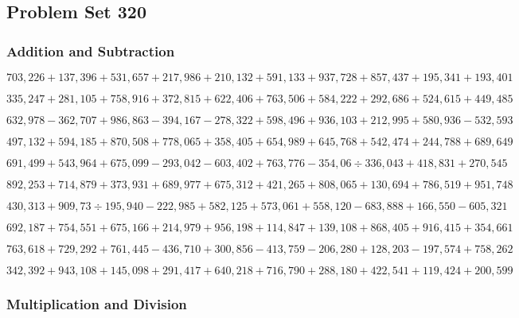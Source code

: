 \hypertarget{problem-set-320}{%
\subsection{Problem Set 320}\label{problem-set-320}}

\hypertarget{addition-and-subtraction}{%
\subsubsection{Addition and
Subtraction}\label{addition-and-subtraction}}

\(703,226+137,396+531,657+217,986+210,132+591,133+937,728+857,437+195,341+193,401\)

\(335,247+281,105+758,916+372,815+622,406+763,506+584,222+292,686+524,615+449,485\)

\(632,978-362,707+986,863-394,167-278,322+598,496+936,103+212,995+580,936-532,593\)

\(497,132+594,185+870,508+778,065+358,405+654,989+645,768+542,474+244,788+689,649\)

\(691,499+543,964+675,099-293,042-603,402+763,776-354,06÷336,043+418,831+270,545\)

\(892,253+714,879+373,931+689,977+675,312+421,265+808,065+130,694+786,519+951,748\)

\(430,313+909,73÷195,940-222,985+582,125+573,061+558,120-683,888+166,550-605,321\)

\(692,187+754,551+675,166+214,979+956,198+114,847+139,108+868,405+916,415+354,661\)

\(763,618+729,292+761,445-436,710+300,856-413,759-206,280+128,203-197,574+758,262\)

\(342,392+943,108+145,098+291,417+640,218+716,790+288,180+422,541+119,424+200,599\)

\hypertarget{multiplication-and-division}{%
\subsubsection{Multiplication and
Division}\label{multiplication-and-division}}

